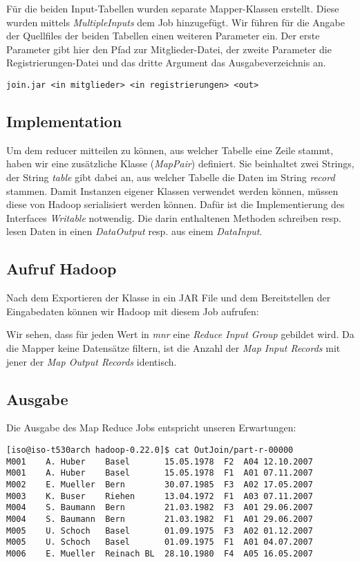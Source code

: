 \documentclass[11pt,a4paper,parskip=half]{scrartcl}
\begin{document}
Für die beiden Input-Tabellen wurden separate Mapper-Klassen erstellt. Diese wurden mittels \emph{MultipleInputs} dem Job hinzugefügt. Wir führen für die Angabe der Quellfiles der beiden Tabellen einen weiteren Parameter ein. Der erste Parameter gibt hier den Pfad zur Mitglieder-Datei, der zweite Parameter die Registrierungen-Datei und das dritte Argument das Ausgabeverzeichnis an.
\begin{lstlisting}
join.jar <in mitglieder> <in registrierungen> <out>
\end{lstlisting}

\subsection{Implementation}
Um dem reducer mitteilen zu können, aus welcher Tabelle eine Zeile stammt, haben wir eine zusätzliche Klasse (\emph{MapPair}) definiert. Sie beinhaltet zwei Strings, der String \emph{table} gibt dabei an, aus welcher Tabelle die Daten im String \emph{record} stammen. Damit Instanzen eigener Klassen verwendet werden können, müssen diese von Hadoop serialisiert werden können. Dafür ist die Implementierung des Interfaces \emph{Writable} notwendig. Die darin enthaltenen Methoden schreiben resp. lesen Daten in einen \emph{DataOutput} resp. aus einem \emph{DataInput}.



\subsection{Aufruf Hadoop}
Nach dem Exportieren der Klasse in ein JAR File und dem Bereitstellen der Eingabedaten können wir Hadoop mit diesem Job aufrufen:


Wir sehen, dass für jeden Wert in \emph{mnr} eine \emph{Reduce Input Group} gebildet wird. Da die Mapper keine Datensätze filtern, ist die Anzahl der \emph{Map Input Records} mit jener der \emph{Map Output Records} identisch.

\subsection{Ausgabe}
Die Ausgabe des Map Reduce Jobs entspricht unseren Erwartungen:
\begin{lstlisting}
[iso@iso-t530arch hadoop-0.22.0]$ cat OutJoin/part-r-00000 
M001	A. Huber	Basel		15.05.1978	F2	A04	12.10.2007
M001	A. Huber	Basel		15.05.1978	F1	A01	07.11.2007
M002	E. Mueller	Bern		30.07.1985	F3	A02	17.05.2007
M003	K. Buser	Riehen		13.04.1972	F1	A03	07.11.2007
M004	S. Baumann	Bern		21.03.1982	F3	A01	29.06.2007
M004	S. Baumann	Bern		21.03.1982	F1	A01	29.06.2007
M005	U. Schoch	Basel		01.09.1975	F3	A02	01.12.2007
M005	U. Schoch	Basel		01.09.1975	F1	A01	04.07.2007
M006	E. Mueller	Reinach BL	28.10.1980	F4	A05	16.05.2007
\end{lstlisting}
\end{document}
